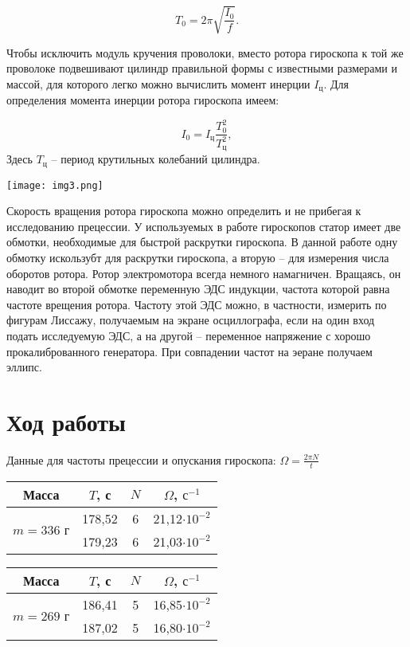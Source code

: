 \documentclass[a4paper,12pt]{article}
\begin{document}
	\begin{equation}
		T_0 = 2\pi\sqrt{\frac{I_0}{f}}.
	\end{equation}

	Чтобы исключить модуль кручения проволоки, вместо ротора гироскопа к той же проволоке подвешивают цилиндр правильной формы с известными размерами и массой, для которого легко можно вычислить момент инерции $I_\text{ц}$. Для определения момента инерции ротора гироскопа имеем:

	\begin{equation}
		I_0 = I_\text{ц}\frac{T_0^2}{T_\text{ц}^2},
		\label{moment}
	\end{equation}
	Здесь $T_\text{ц}$ -- период крутильных колебаний цилиндра.\\
	\begin{center}
		\texttt{[image: img3.png]}
	\end{center}

	Скорость вращения ротора гироскопа можно определить и не прибегая к исследованию прецессии. У используемых в работе гироскопов статор имеет две обмотки, необходимые для быстрой раскрутки гироскопа. В данной работе одну обмотку искользубт для раскрутки гироскопа, а вторую -- для измерения числа оборотов ротора. Ротор электромотора всегда немного намагничен. Вращаясь, он наводит во второй обмотке переменную ЭДС индукции, частота которой равна частоте врещения ротора. Частоту этой ЭДС можно, в частности, измерить по фигурам Лиссажу, получаемым на экране осциллографа, если на один вход подать исследуемую ЭДС, а на другой -- переменное напряжение с хорошо прокалиброванного генератора. При совпадении частот на эеране получаем эллипс.

	\section{Ход работы}
	Данные для частоты прецессии и опускания гироскопа: $\Omega=\frac{2\pi N}{t}$

	\begin{center}
		\begin{tabular}{|c|c|c|c|}
			\hline
			Масса & $T$, с& $N$ & $\Omega$, $\text{с}^{-1}$  \\
			\hline
			\multirow{2}{*}{$m = 336$ г}&178,52&6&21,12$\cdot 10^{-2}$ \\
			\cline{2-4}
			&179,23 & 6 &21,03$\cdot 10^{-2}$  \\
			\hline
		\end{tabular}
		\quad
		\begin{tabular}{|c|c|c|c|}
			\hline
			Масса & $T$, с& $N$ & $\Omega$, $\text{с}^{-1}$ \\
			\hline
			\multirow{2}{*}{$m = 269$ г}&186,41&5&16,85$\cdot 10^{-2}$ \\
			\cline{2-4}
			&187,02 & 5 &16,80$\cdot 10^{-2}$  \\
			\hline
		\end{tabular}
	\end{center}
\end{document}
